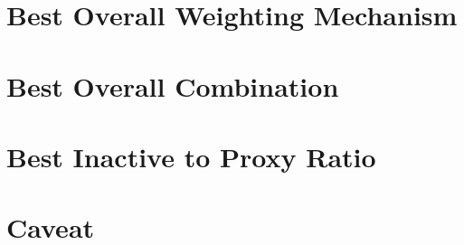 \section{Best Overall Weighting Mechanism}\label{sec:best-overall-weighting-mechanism}


\section{Best Overall Combination}\label{sec:best-overall-combination}


\section{Best Inactive to Proxy Ratio}\label{sec:best-inactive-to-proxy-count}


\section{Caveat}\label{sec:caveat}

